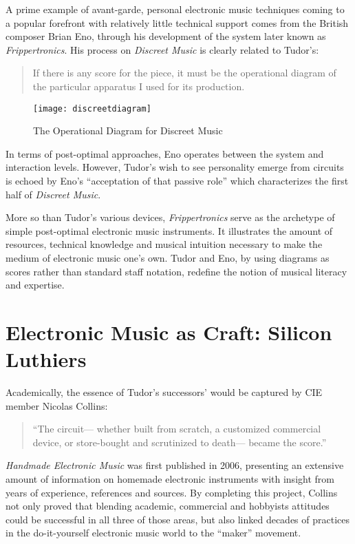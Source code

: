 A prime example of avant-garde, personal electronic music techniques coming to a popular forefront with relatively little technical support comes from the British composer Brian Eno, through his development of the system later known as \emph{Frippertronics}. His process on \emph{Discreet Music} is clearly related to Tudor's: 

\begin{quote}
	If there is any score for the piece, it must be the operational diagram of the particular apparatus I used for its production. \citep{eno1975}
\end{quote}

\begin{figure}[H]
  
  \centering
    \texttt{[image: discreetdiagram]}
    \caption{The Operational Diagram for Discreet Music\citep{eno1975}}
\end{figure}

In terms of post-optimal approaches, Eno operates between the system and interaction levels. However, Tudor's wish to see personality emerge from circuits is echoed by Eno's  ``acceptation of that passive role'' which characterizes the first half of \emph{Discreet Music}. 

More so than Tudor's various devices, \emph{Frippertronics} serve as the archetype of simple post-optimal electronic music instruments. It illustrates the amount of resources, technical knowledge and musical intuition necessary to make the medium of electronic music one's own. Tudor and Eno, by using diagrams as scores rather than standard staff notation, redefine the notion of musical literacy and expertise. 

\section{Electronic Music as Craft: Silicon Luthiers} 

Academically, the essence of Tudor’s successors’ would be captured by CIE member Nicolas Collins:

\begin{quote}
“The circuit— whether built from scratch, a customized commercial device, or store-bought and scrutinized to death— became the score.”
\end{quote}

\citep{collins2004}

\emph{Handmade Electronic Music} was first published in 2006, presenting an extensive amount of information on homemade electronic instruments with insight from years of experience, references and sources. By completing this project, Collins not only proved that blending academic, commercial and hobbyists attitudes could be successful in all three of those areas, but also linked decades of practices in the do-it-yourself electronic music world to the “maker” movement. 

